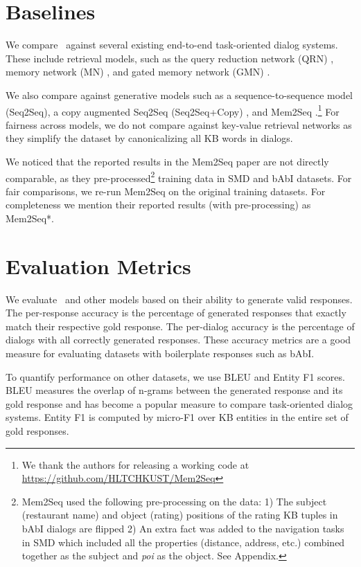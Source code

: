 \section{Baselines}
We compare \sys\ against several existing end-to-end task-oriented dialog systems. These include retrieval models, such as the query reduction network (QRN) \cite{seo2016query}, memory network (MN) \cite{BordesW16}, and gated memory network (GMN) \cite{liu2017gated}. 

We also compare against generative models such as a sequence-to-sequence model (Seq2Seq), a copy augmented Seq2Seq (Seq2Seq+Copy) \cite{ptr-unk}, and Mem2Seq \cite{mem2seq}.\footnote{We thank the authors for releasing a working code at \url{https://github.com/HLTCHKUST/Mem2Seq}} For fairness across models, we do not compare against key-value retrieval networks \cite{Ericsigdial} as they simplify the dataset by canonicalizing all KB words in dialogs.

We noticed that the reported results in the Mem2Seq paper are not directly comparable, as they pre-processed\footnote{Mem2Seq used the following pre-processing on the data: 1) The subject (restaurant name) and object (rating) positions of the rating KB tuples in bAbI dialogs are flipped 2) An extra fact was added to the navigation tasks in SMD which included all the properties (distance, address, etc.) combined together  as the subject and \textit{poi} as the object. See Appendix.} training data in SMD and bAbI datasets. For fair comparisons, we re-run Mem2Seq on the original training datasets. For completeness we mention their reported results (with pre-processing) as Mem2Seq*.

\section{Evaluation Metrics}
We evaluate \sys\ and other models based on their ability to generate valid responses. The per-response accuracy \cite{BordesW16} is the percentage of generated responses that exactly match their respective gold response. The per-dialog accuracy is the percentage of dialogs with all correctly generated responses. These accuracy metrics are a good measure for evaluating datasets with boilerplate responses such as bAbI. 

To quantify performance on other datasets, we use BLEU \cite{papineni2002bleu} and Entity F1 \cite{eric2017copy} scores. BLEU measures the overlap of n-grams between the generated response and its gold response and has become a popular measure to compare task-oriented dialog systems. Entity F1 is computed by micro-F1 over KB entities in the entire set of gold responses. 

